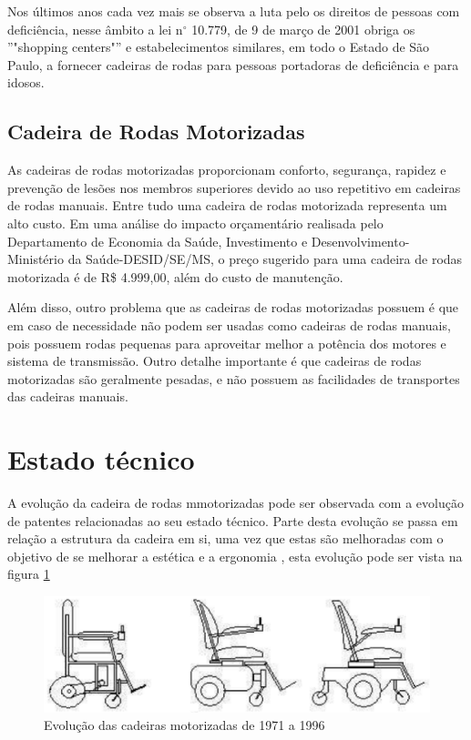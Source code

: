 Nos últimos anos cada vez mais se observa a luta pelo os direitos de pessoas com deficiência, nesse âmbito a lei n$^{\circ}$ 10.779, de 9 de março de 2001 obriga os ''"shopping centers"'' e estabelecimentos similares, em todo o Estado de São Paulo, a fornecer cadeiras de rodas para pessoas portadoras de deficiência e para idosos.

\subsection{Cadeira de Rodas Motorizadas}

As cadeiras de rodas motorizadas proporcionam conforto, segurança, rapidez e prevenção de lesões nos membros superiores devido ao uso repetitivo em cadeiras de rodas manuais. Entre tudo uma cadeira de rodas motorizada representa um alto custo. Em uma análise do impacto orçamentário realisada pelo Departamento de Economia da Saúde, Investimento e Desenvolvimento- Ministério da Saúde-DESID/SE/MS, o preço sugerido para uma cadeira de rodas motorizada é de R\$ 4.999,00, além do custo de manutenção. \cite{relatorio_sus}

Além disso, outro problema que as cadeiras de rodas motorizadas possuem é que em caso de necessidade não podem ser usadas como cadeiras de rodas manuais, pois possuem rodas pequenas para aproveitar melhor a potência dos motores e sistema de transmissão. Outro detalhe importante é que cadeiras de rodas motorizadas são geralmente pesadas, e não possuem as facilidades de transportes das cadeiras manuais.

\section{Estado técnico}

A evolução da cadeira de rodas mmotorizadas pode ser observada com a evolução de patentes relacionadas ao seu estado técnico. Parte desta evolução se passa em relação a estrutura da cadeira em si, uma vez que estas são melhoradas com o objetivo de se melhorar a estética e a ergonomia \cite{artigo_rudi}, esta evolução pode ser vista na figura \ref{fig:cadeiras_evolucao}

\begin{figure}[!htb]
\centering
  \includegraphics[keepaspectratio=true,scale=0.6]{figuras/introducao/cadeiras_evolucao}
\caption{Evolução das cadeiras motorizadas de 1971 a 1996}
\label{fig:cadeiras_evolucao}
\end{figure}

